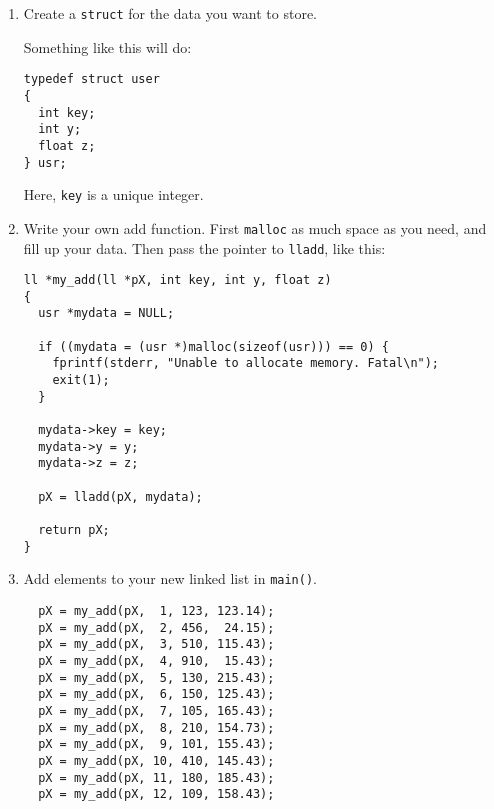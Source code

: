 \documentclass{article}
\begin{document}
\begin{enumerate}
\item Create a \verb|struct| for the data you want to store.\\
  

\vspace{8pt}

Something like this will do:\\[8pt]
\begin{verbatim}
typedef struct user 
{
  int key;
  int y;
  float z;
} usr;
\end{verbatim}

\vspace{5pt}

Here, \verb|key| is a unique integer.

\item Write your own add function. First \verb|malloc| as much space as you need, and fill up your
data. Then pass the pointer to \verb|lladd|, like this:\\[5pt]
\begin{verbatim}
ll *my_add(ll *pX, int key, int y, float z)
{
  usr *mydata = NULL;
  
  if ((mydata = (usr *)malloc(sizeof(usr))) == 0) {
    fprintf(stderr, "Unable to allocate memory. Fatal\n");
    exit(1);
  }

  mydata->key = key;
  mydata->y = y;
  mydata->z = z;

  pX = lladd(pX, mydata);

  return pX;
}
\end{verbatim}
\item Add elements to your new linked list in \verb|main()|.\\[8pt]
\begin{verbatim}
  pX = my_add(pX,  1, 123, 123.14);
  pX = my_add(pX,  2, 456,  24.15);
  pX = my_add(pX,  3, 510, 115.43);
  pX = my_add(pX,  4, 910,  15.43);
  pX = my_add(pX,  5, 130, 215.43);
  pX = my_add(pX,  6, 150, 125.43);
  pX = my_add(pX,  7, 105, 165.43);
  pX = my_add(pX,  8, 210, 154.73);
  pX = my_add(pX,  9, 101, 155.43);
  pX = my_add(pX, 10, 410, 145.43);
  pX = my_add(pX, 11, 180, 185.43);
  pX = my_add(pX, 12, 109, 158.43);
\end{verbatim}
\end{enumerate}
\end{document}

